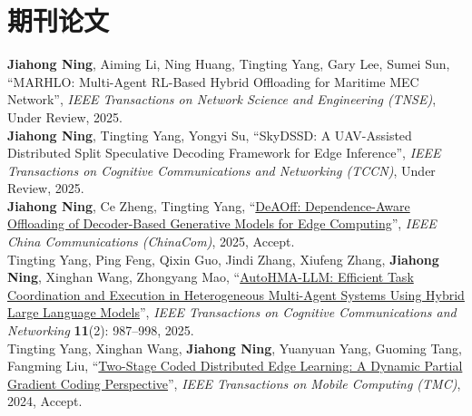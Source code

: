\documentclass{resume}
\begin{document}



\section{期刊论文}

\textbf{Jiahong Ning}, Aiming Li, Ning Huang, Tingting Yang, Gary Lee, Sumei Sun,
``MARHLO: Multi-Agent RL-Based Hybrid Offloading for Maritime MEC Network'',
\emph{IEEE Transactions on Network Science and Engineering (TNSE)}, Under Review, 2025.\\

\textbf{Jiahong Ning}, Tingting Yang, Yongyi Su,
``SkyDSSD: A UAV-Assisted Distributed Split Speculative Decoding Framework for Edge Inference'',
\emph{IEEE Transactions on Cognitive Communications and Networking (TCCN)}, Under Review, 2025.\\


\textbf{Jiahong Ning}, Ce Zheng, Tingting Yang, “\href{https://www.researchgate.net/publication/392398718_DeAOff_Dependence-aware_offloading_of_decoder-based_generative_models_for_edge_computing}{DeAOff: Dependence-Aware Offloading of Decoder-Based Generative Models for Edge Computing}”, \emph{IEEE China Communications (ChinaCom)}, 2025, Accept.\\

Tingting Yang, Ping Feng, Qixin Guo, Jindi Zhang, Xiufeng Zhang, \textbf{Jiahong Ning}, Xinghan Wang, Zhongyang Mao, ``\href{https://dblp.org/rec/journals/tccn/YangFGZZNWM25}{AutoHMA-LLM: Efficient Task Coordination and Execution in Heterogeneous Multi-Agent Systems Using Hybrid Large Language Models}'', \emph{IEEE Transactions on Cognitive Communications and Networking} \textbf{11}(2): 987--998, 2025.\\

Tingting Yang, Xinghan Wang, \textbf{Jiahong Ning}, Yuanyuan Yang, Guoming Tang, Fangming Liu, “\href{https://arxiv.org/abs/2205.07939}{Two-Stage Coded Distributed Edge Learning: A Dynamic Partial Gradient Coding Perspective}”, \emph{IEEE Transactions on Mobile Computing (TMC)}, 2024, Accept.\\
\end{document}
